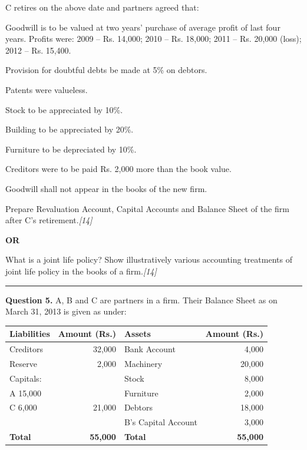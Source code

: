 \documentclass[11pt,a4paper]{article}
\newcommand{\pts}[1]{\hfill   \textit{[#1]}}
\begin{document}
\pagebreak

C retires on the above date and partners agreed that:

\begin{parts}
  \item Goodwill is to be valued at two years' purchase of average profit of last four years. Profits were: 2009 -- Rs. 14,000; 2010 -- Rs. 18,000; 2011 -- Rs. 20,000 (loss); 2012 -- Rs. 15,400.
  \item Provision for doubtful debts be made at 5\% on debtors.
  \item Patents were valueless.
  \item Stock to be appreciated by 10\%.
  \item Building to be appreciated by 20\%.
  \item Furniture to be depreciated by 10\%.
  \item Creditors were to be paid Rs. 2,000 more than the book value.
  \item Goodwill shall not appear in the books of the new firm.
\end{parts}
Prepare Revaluation Account, Capital Accounts and Balance Sheet of the firm after C's retirement.\pts{14}

\centerline{   \textbf{OR}}

What is a joint life policy? Show illustratively various accounting treatments of joint life policy in the books of a firm.\pts{14}

\medskip\rule{\linewidth}{0.2pt}




\noindent   \textbf{Question 5.}
A, B and C are partners in a firm. Their Balance Sheet as on March 31, 2013 is given as under:


\begin{center}
\small

\begin{tabular}{|l|r||l|r|}
\hline
   \textbf{Liabilities} &   \textbf{Amount (Rs.)} &   \textbf{Assets} &   \textbf{Amount (Rs.)} \\
\hline
Creditors & 32,000 & Bank Account & 4,000 \\
Reserve & 2,000 & Machinery & 20,000 \\
Capitals: & & Stock & 8,000 \\
\quad A \hfill 15,000 & & Furniture & 2,000 \\
\quad C \hfill 6,000 & 21,000 & Debtors & 18,000 \\
& & B's Capital Account & 3,000 \\
\hline
   \textbf{Total} &   \textbf{55,000} &   \textbf{Total} &   \textbf{55,000} \\
\hline
\end{tabular}
\end{center}
\end{document}
